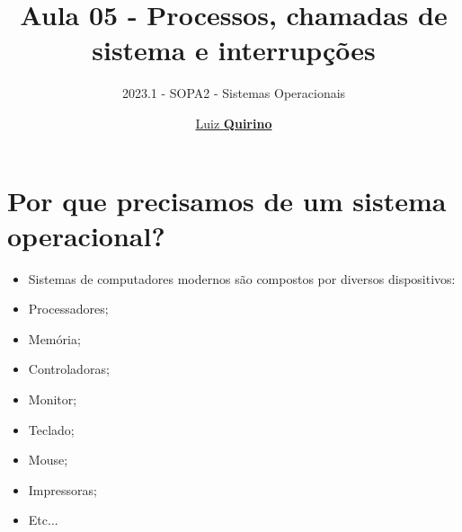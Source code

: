 \documentclass{beamer}
\title{Aula 05 - Processos, chamadas de sistema e interrupções}
\subtitle{2023.1 - SOPA2 - Sistemas Operacionais}
\author{\href{mailto:luiz.quirino@ifsp.edu.br}{Luiz \textbf{Quirino}}}
\newcommand{\hrefcol}[2]{\textcolor{cyan}{\href{#1}{#2}}}
\begin{document}
\maketitle

%
%





\section{Por que precisamos de um sistema operacional?}
\begin{frame}
      

\begin{itemize}
  \item Sistemas de computadores modernos são compostos por diversos dispositivos:
  \item Processadores;
  \item Memória;
  \item Controladoras;
  \item Monitor;
  \item Teclado;
  \item Mouse;
               
                 \item Impressoras;
               
                 \item Etc...
               
               \end{itemize}
                     
     \end{frame}
     
\end{document}
